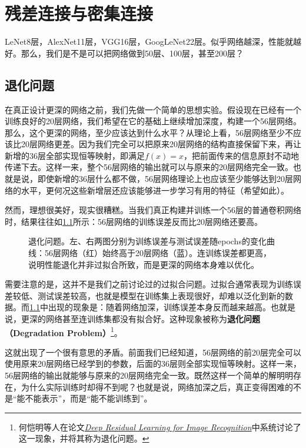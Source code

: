 
\chapter{残差连接与密集连接}

LeNet8层，AlexNet11层，VGG16层，GoogLeNet22层。似乎网络越深，性能就越好。那么，我们是不是可以把网络做到50层、100层，甚至200层？

\section{退化问题}

在真正设计更深的网络之前，我们先做一个简单的思想实验。假设现在已经有一个训练良好的20层网络，我们希望在它的基础上继续增加深度，构建一个56层网络。那么，这个更深的网络，至少应该达到什么水平？从理论上看，56层网络至少不应该比20层网络更差。因为我们完全可以把原来20层网络的结构直接保留下来，再让新增的36层全部实现恒等映射，即满足$f(x)=x$，把前面传来的信息原封不动地传递下去。这样一来，整个56层网络的输出就可以与原来的20层网络完全一致。也就是说，即使新增的36层什么都不做，56层网络理论上也应该至少能够达到20层网络的水平，更何况这些新增层还应该能够进一步学习有用的特征（希望如此）。

然而，理想很美好，现实很糟糕。当我们真正构建并训练一个56层的普通卷积网络时，结果往往如\cref{fig:degradation}所示：56层网络的训练误差反而比20层网络还要高。

\begin{figure}[H]
    \caption{退化问题。左、右两图分别为训练误差与测试误差随epochs的变化曲线：56层网络（红）始终高于20层网络（蓝）。连训练误差都更高，说明性能退化并非过拟合所致，而是更深的网络本身难以优化。}
    \label{fig:degradation}
\end{figure}

需要注意的是，这并不是我们之前讨论过的过拟合问题。过拟合通常表现为训练误差较低、测试误差较高，也就是模型在训练集上表现很好，却难以泛化到新的数据。而\cref{fig:degradation}中出现的现象是：随着网络加深，训练误差本身反而越来越高。也就是说，更深的网络甚至连训练集都没有拟合好。这种现象被称为\textbf{退化问题（Degradation Problem）}\footnote{何恺明等人在论文\href{https://www.cv-foundation.org/openaccess/content_cvpr_2016/papers/He_Deep_Residual_Learning_CVPR_2016_paper.pdf}{\textit{Deep Residual Learning for Image Recognition}}中系统讨论了这一现象，并将其称为退化问题。}。

这就出现了一个很有意思的矛盾。前面我们已经知道，56层网络的前20层完全可以使用原来20层网络已经学到的参数，后面的36层则全部实现恒等映射。这样一来，56层网络的输出就能够与原来的20层网络完全一致。既然这样一个简单的解明明存在，为什么实际训练时却得不到呢？也就是说，网络加深之后，真正变得困难的不是“能不能表示”，而是“能不能训练到”。

